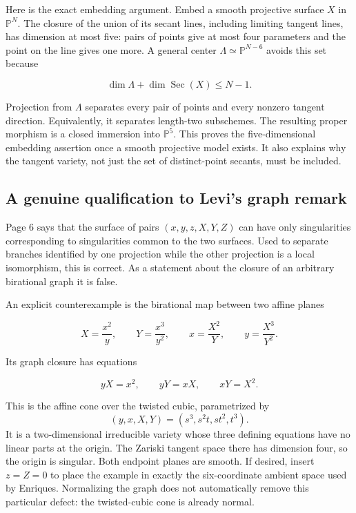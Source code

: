 Here is the exact embedding argument. Embed a smooth projective surface \(X\) in \(\mathbb P^N\). The closure of the union of its secant lines, including limiting tangent lines, has dimension at most five: pairs of points give at most four parameters and the point on the line gives one more. A general center \(\Lambda\simeq\mathbb P^{N-6}\) avoids this set because

\[
\dim\Lambda+\dim\operatorname{Sec}(X)\le N-1.
\]

Projection from \(\Lambda\) separates every pair of points and every nonzero tangent direction. Equivalently, it separates length-two subschemes. The resulting proper morphism is a closed immersion into \(\mathbb P^5\). This proves the five-dimensional embedding assertion once a smooth projective model exists. It also explains why the tangent variety, not just the set of distinct-point secants, must be included.

\subsection{A genuine qualification to Levi's graph remark}

Page 6 says that the surface of pairs \((x,y,z,X,Y,Z)\) can have only singularities corresponding to singularities common to the two surfaces. Used to separate branches identified by one projection while the other projection is a local isomorphism, this is correct. As a statement about the closure of an arbitrary birational graph it is false.

An explicit counterexample is the birational map between two affine planes

\[
X=\frac{x^2}{y},\qquad Y=\frac{x^3}{y^2},
\qquad
x=\frac{X^2}{Y},\qquad y=\frac{X^3}{Y^2}.
\]

Its graph closure has equations

\[
yX=x^2,\qquad yY=xX,\qquad xY=X^2.
\]

This is the affine cone over the twisted cubic, parametrized by\[ (y,x,X,Y)=(s^3,s^2t,st^2,t^3). \] It is a two-dimensional irreducible variety whose three defining equations have no linear parts at the origin. The Zariski tangent space there has dimension four, so the origin is singular. Both endpoint planes are smooth. If desired, insert \(z=Z=0\) to place the example in exactly the six-coordinate ambient space used by Enriques. Normalizing the graph does not automatically remove this particular defect: the twisted-cubic cone is already normal.

